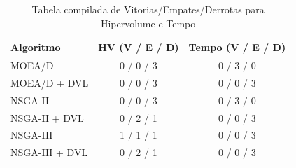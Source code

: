 \begin{table}[h]
  \centering
  \caption{Tabela compilada de Vitorias/Empates/Derrotas para Hipervolume e Tempo}
  \begin{tabular}{lcc}
    \toprule
    Algoritmo & HV (V / E / D) & Tempo (V / E / D) \\
    \midrule
    MOEA/D & 0 / 0 / 3 & 0 / 3 / 0 \\
    MOEA/D + DVL & 0 / 0 / 3 & 0 / 0 / 3 \\
    NSGA-II & 0 / 0 / 3 & 0 / 3 / 0 \\
    NSGA-II + DVL & 0 / 2 / 1 & 0 / 0 / 3 \\
    NSGA-III & 1 / 1 / 1 & 0 / 0 / 3 \\
    NSGA-III + DVL & 0 / 2 / 1 & 0 / 0 / 3 \\
    \bottomrule
  \end{tabular}
\end{table}